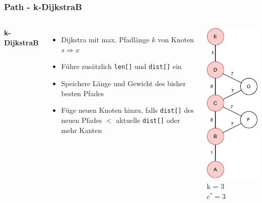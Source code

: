 \documentclass[aspectratio=169]{beamer}
\begin{document}

\begin{frame}
	\frametitle{Path - k-DijkstraB}
	\begin{columns}[c] %
		
		\textbf{k-DijkstraB}
		\begin{itemize}
			\item Dijkstra mit max. Pfadlänge $k$ von Knoten $s \Rightarrow x$
			\item Führe zusätzlich \texttt{len[]} und \texttt{dist[]} ein
			\item Speichere Länge und Gewicht des bisher besten Pfades
			\item Füge neuen Knoten hinzu, falls \texttt{dist[]} des neuen Pfades $<$ aktuelle \texttt{dist[]} oder mehr Kanten
		\end{itemize}
		\includegraphics[scale=.5]{path_optimal.pdf}
		k = 3\\
		$c^* = 3$
		
		
	\end{columns}
	\end{frame}
	
\end{document}
